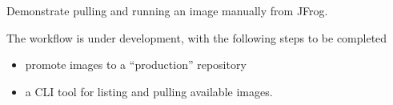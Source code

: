 Demonstrate pulling and running an image manually from JFrog.

The workflow is under development, with the following steps to be completed
\begin{itemize}
    \item promote images to a ``production'' repository
    \item a CLI tool for listing and pulling available images.
\end{itemize}

